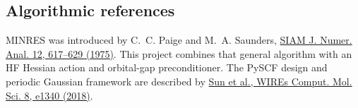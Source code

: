 \subsection{Algorithmic references}

MINRES was introduced by C.~C. Paige and M.~A. Saunders,
\href{https://doi.org/10.1137/0712047}{SIAM J. Numer. Anal. 12, 617--629
(1975)}.  This project combines that general algorithm with an HF Hessian
action and orbital-gap preconditioner.  The PySCF design and periodic Gaussian
framework are described by
\href{https://doi.org/10.1002/wcms.1340}{Sun et al., WIREs Comput. Mol. Sci.
8, e1340 (2018)}.
